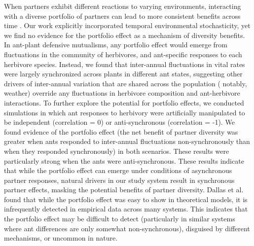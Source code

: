 \documentclass[11pt]{article}
\begin{document}
When partners exhibit different reactions to varying environments, interacting with a diverse portfolio of partners can lead to more consistent benefits across time \citep{Batstone2018}.
Our work explicitly incorporated temporal environmental stochasticity, yet we find no evidence for the portfolio effect as a mechanism of diversity benefits. 
In ant-plant defensive mutualisms, any portfolio effect would emerge from fluctuations in the community of herbivores, and ant-specific responses to each herbivore species. 
Instead, we found that inter-annual fluctuations in vital rates were largely synchronized across plants in different ant states, suggesting other drivers of inter-annual variation that are shared across the population ( notably, weather) override any fluctuations in herbivore composition and ant-herbivore interactions. 
To further explore the potential for portfolio effects, we conducted simulations in which ant responses to herbivory were artificially manipulated to be independent (correlation = 0) or anti-synchronous (correlation = -1). 
We found evidence of the portfolio effect (the net benefit of partner diversity was greater when ants responded to inter-annual fluctuations non-synchronously than when they responded synchronously) in both scenarios.
These results were particularly strong when the ants were anti-synchronous.
These results indicate that while the portfolio effect can emerge under conditions of asynchronous partner responses, natural drivers in our study system result in synchronous partner effects, masking the potential benefits of partner diversity. 
Dallas et al. \citeyear{dallas2022temporal} found that while the portfolio effect was easy to show in theoretical models, it is infrequently detected in empirical data across many systems. 
This indicates that the portfolio effect may be difficult to detect (particularly in similar systems where ant differences are only somewhat non-synchronous), disguised by different mechanisms, or uncommon in nature. 
\end{document}
